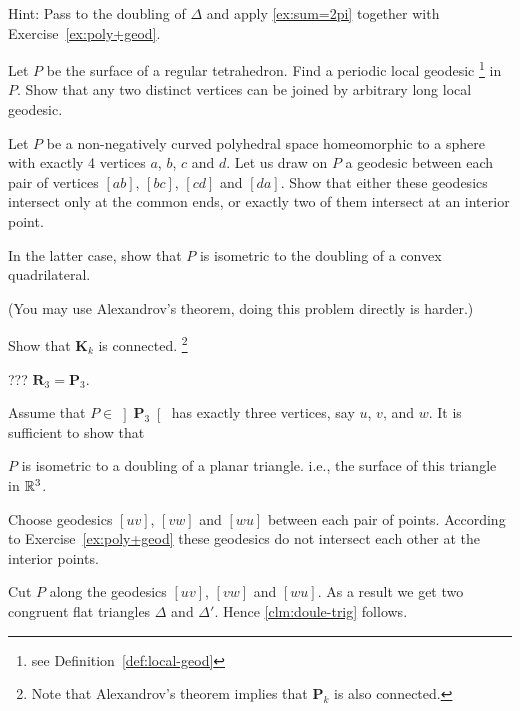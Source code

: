 Hint: Pass to the doubling of $\Delta$ and apply \ref{ex:sum=2pi} together with Exercise~\ref{ex:poly+geod}.

\begin{pr}  
Let $P$ be the surface of a regular tetrahedron.
Find a periodic local geodesic%
\footnote{see Definition~\ref{def:local-geod}} in $P$.
Show that any two distinct vertices can be joined by arbitrary long local geodesic.   
\end{pr}





\begin{pr}
Let $P$ be a non-negatively curved polyhedral space homeomorphic to a sphere with exactly 4 vertices
$a$, $b$, $c$ and $d$.
Let us draw on $P$ a geodesic between each pair of vertices $[ab]$,
$[bc]$, $[cd]$ and $[da]$.
Show that either these geodesics intersect only at the common ends, 
or exactly two of them intersect at an interior point.

In the latter case, show that $P$ is isometric to the doubling of a convex quadrilateral. 

(You may use Alexandrov's theorem, doing this problem directly is harder.)
\end{pr}


\begin{pr}
Show that $\mathbf{K}_k$ is connected.%
\footnote{Note that Alexandrov's theorem implies that $\mathbf{P}_k$ is also connected.}
\end{pr}




??? 
$\mathbf{R}_3=\mathbf{P}_3$.

Assume that $P\in \left]\mathbf{P}_3\right[$ has exactly three vertices, say $u$, $v$, and $w$. 
It is sufficient to show that 
\begin{clm}{}\label{clm:doule-trig}
$P$ is isometric to a
doubling of a planar triangle.
i.e., the surface of this triangle in $\mathbb{R}^3$.
\end{clm}

Choose geodesics  $[uv]$, $[vw]$ and $[wu]$ between each pair of points.
According to Exercise~\ref{ex:poly+geod}
these geodesics do not intersect each other at the interior points. 

Cut $P$ along the geodesics $[uv]$, $[vw]$ and $[wu]$.
As a result we get two congruent flat triangles $\Delta$ and $\Delta'$.
Hence \ref{clm:doule-trig} follows.
\qeds 





   

